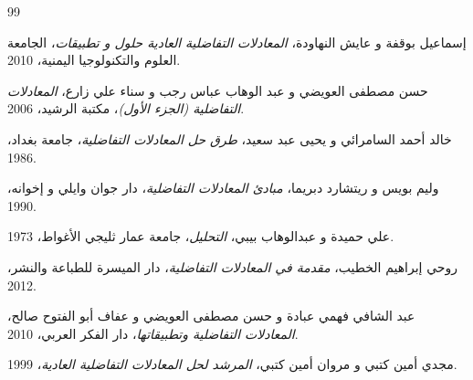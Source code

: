 \begin{thebibliography}{99}
	
	إسماعيل بوقفة و عايش النهاودة،
	\textit{المعادلات التفاضلية العادية حلول و تطبيقات}،
	الجامعة العلوم والتكنولوجيا اليمنية،
	2010.
	
	حسن مصطفى العويضي و عبد الوهاب عباس رجب و سناء علي زارع،
	\textit{المعادلات التفاضلية (الجزء الأول)}،
	مكتبة الرشيد،
	2006.
	
	خالد أحمد السامرائي و يحيى عبد سعيد،
	\textit{طرق حل المعادلات التفاضلية}،
	جامعة بغداد،
	1986.
	
	وليم بويس و ريتشارد دبريما،
	\textit{مبادئ المعادلات التفاضلية}،
	دار جوان وايلي و إخوانه،
	1990.
	
	علي حميدة و عبدالوهاب بيبي،
	\textit{التحليل}،
	جامعة عمار ثليجي الأغواط،
	1973.
	
	روحي إبراهيم الخطيب،
	\textit{مقدمة في المعادلات التفاضلية}،
	دار الميسرة للطباعة والنشر،
	2012.
	
	عبد الشافي فهمي عبادة و حسن مصطفى العويضي و عفاف أبو الفتوح صالح،
	\textit{المعادلات التفاضلية وتطبيقاتها}،
	دار الفكر العربي،
	2010.
	
	مجدي أمين كتبي و مروان أمين كتبي،
	\textit{المرشد لحل المعادلات التفاضلية العادية}،
	1999.
	
\end{thebibliography}
